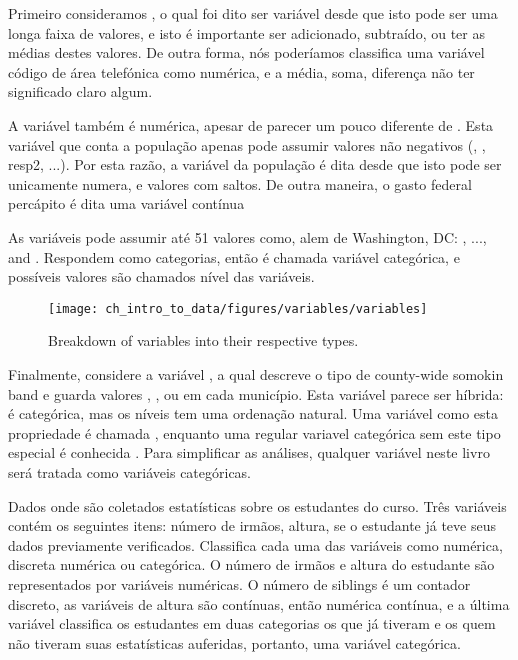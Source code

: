 Primeiro consideramos , o qual foi dito ser variável  desde que isto pode ser uma longa faixa de valores, e isto é importante ser adicionado, subtraído, ou ter as médias destes valores. De outra forma, nós poderíamos classifica uma variável código de área telefónica como numérica, e a média, soma, diferença não ter significado claro algum.

A variável  também é numérica, apesar de parecer um pouco diferente de . Esta variável que conta a população apenas pode assumir valores não negativos (, , resp{2}, ...). Por esta razão, a variável da população é dita  desde que isto pode ser unicamente numera, e valores com saltos. De outra maneira, o gasto federal percápito é dita uma variável contínua

As variáveis  pode assumir até 51 valores como, alem de Washington, DC:  , ..., and . Respondem como categorias,  então é chamada variável categórica, e possíveis valores são chamados nível das variáveis.

\begin{figure}
\centering
\texttt{[image: ch\_intro\_to\_data/figures/variables/variables]}
\caption{Breakdown of variables into their respective types.}
\label{variables}
\end{figure}

Finalmente, considere a variável , a qual descreve o tipo de county-wide somokin band e guarda valores , , ou  em cada município. Esta variável parece ser híbrida: é categórica, mas os níveis tem uma ordenação natural. Uma variável como esta propriedade é chamada , enquanto uma regular variavel categórica sem este tipo especial é conhecida . Para simplificar as análises, qualquer variável neste livro será tratada como variáveis categóricas.

\begin{example}{Dados onde são coletados estatísticas sobre os estudantes do curso. Três variáveis contém os seguintes itens: número de irmãos, altura, se o estudante já teve seus dados previamente verificados. Classifica cada uma das variáveis como numérica, discreta numérica ou categórica.}
O número de irmãos e altura do estudante são representados por variáveis numéricas. O número de siblings é um contador discreto, as variáveis de altura são contínuas, então numérica contínua, e a última variável classifica os estudantes em duas categorias os que já tiveram e os quem não tiveram suas estatísticas auferidas, portanto, uma variável categórica.
\end{example}

